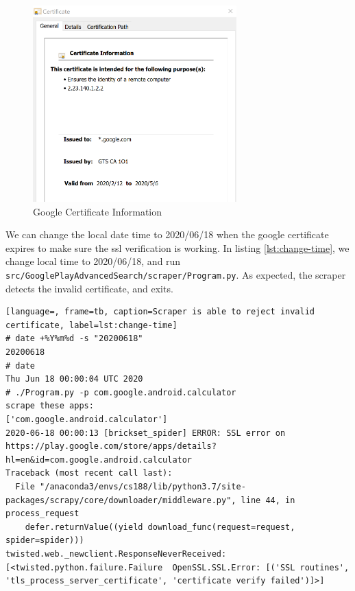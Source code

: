 \documentclass[12pt, a4paper]{article}
\newcommand{\code}[1]{\texttt{#1}}
\begin{document}
\begin{figure}[ht]
\centering
\includegraphics[width=0.7\textwidth]{google_certification_time.png}
\caption{Google Certificate Information}
\label{fig:google-certificate-information}
\end{figure}


We can change the local date time to 2020/06/18 when the google certificate expires to make sure the ssl verification is working. In listing \ref{lst:change-time}, we change local time to 2020/06/18, and run \code{src/GooglePlayAdvancedSearch/\linebreak[0]scraper/\linebreak[0]Program.py}. As expected, the scraper detects the invalid certificate, and exits.




\begin{lstlisting}[language=, frame=tb, caption=Scraper is able to reject invalid certificate, label=lst:change-time]
# date +%Y%m%d -s "20200618"
20200618
# date
Thu Jun 18 00:00:04 UTC 2020
# ./Program.py -p com.google.android.calculator
scrape these apps:
['com.google.android.calculator']
2020-06-18 00:00:13 [brickset_spider] ERROR: SSL error on https://play.google.com/store/apps/details?hl=en&id=com.google.android.calculator
Traceback (most recent call last):
  File "/anaconda3/envs/cs188/lib/python3.7/site-packages/scrapy/core/downloader/middleware.py", line 44, in process_request
    defer.returnValue((yield download_func(request=request, spider=spider)))
twisted.web._newclient.ResponseNeverReceived: [<twisted.python.failure.Failure  OpenSSL.SSL.Error: [('SSL routines', 'tls_process_server_certificate', 'certificate verify failed')]>]
\end{lstlisting}
\end{document}
